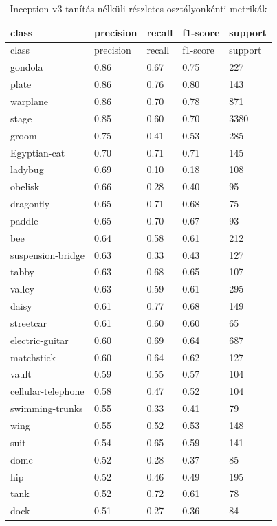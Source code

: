 \begin{center}
\begin{longtable}{lllll}
\caption{Inception-v3 tanítás nélküli részletes osztályonkénti metrikák}\label{tab:phase1_Inception-v3_class_table}\\
\toprule
class & precision & recall & f1-score & support \\
\midrule
\endfirsthead
\toprule
class & precision & recall & f1-score & support \\
\midrule
\endhead
gondola & 0.86 & 0.67 & 0.75 & 227 \\
plate & 0.86 & 0.76 & 0.80 & 143 \\
warplane & 0.86 & 0.70 & 0.78 & 871 \\
stage & 0.85 & 0.60 & 0.70 & 3380 \\
groom & 0.75 & 0.41 & 0.53 & 285 \\
Egyptian-cat & 0.70 & 0.71 & 0.71 & 145 \\
ladybug & 0.69 & 0.10 & 0.18 & 108 \\
obelisk & 0.66 & 0.28 & 0.40 & 95 \\
dragonfly & 0.65 & 0.71 & 0.68 & 75 \\
paddle & 0.65 & 0.70 & 0.67 & 93 \\
bee & 0.64 & 0.58 & 0.61 & 212 \\
suspension-bridge & 0.63 & 0.33 & 0.43 & 127 \\
tabby & 0.63 & 0.68 & 0.65 & 107 \\
valley & 0.63 & 0.59 & 0.61 & 295 \\
daisy & 0.61 & 0.77 & 0.68 & 149 \\
streetcar & 0.61 & 0.60 & 0.60 & 65 \\
electric-guitar & 0.60 & 0.69 & 0.64 & 687 \\
matchstick & 0.60 & 0.64 & 0.62 & 127 \\
vault & 0.59 & 0.55 & 0.57 & 104 \\
cellular-telephone & 0.58 & 0.47 & 0.52 & 104 \\
swimming-trunks & 0.55 & 0.33 & 0.41 & 79 \\
wing & 0.55 & 0.52 & 0.53 & 148 \\
suit & 0.54 & 0.65 & 0.59 & 141 \\
dome & 0.52 & 0.28 & 0.37 & 85 \\
hip & 0.52 & 0.46 & 0.49 & 195 \\
tank & 0.52 & 0.72 & 0.61 & 78 \\
dock & 0.51 & 0.27 & 0.36 & 84 \\

\end{longtable}
\end{center}
